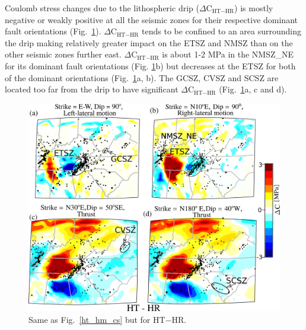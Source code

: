 \documentclass[draft,linenumbers]{agujournal2018}
\begin{document}
Coulomb stress changes due to the lithospheric drip ($\Delta$C$_{\text{HT}-\text{HR}}$) is mostly negative or weakly positive at all the seismic zones for their respective dominant fault orientations (Fig.~\ref{ht_hr_cs}). $\Delta$C$_{\text{HT}-\text{HR}}$ tends to be confined to an area surrounding the drip making relatively greater impact on the ETSZ and NMSZ than on the other seismic zones further east. $\Delta$C$_{\text{HT}-\text{HR}}$ is about 1-2 MPa in the NMSZ\_NE for its dominant fault orientations (Fig. \ref{ht_hr_cs}b) but decreases at the ETSZ for both of the dominant orientations (Fig.~\ref{ht_hr_cs}a, b). The GCSZ, CVSZ and SCSZ are located too far from the drip to have significant $\Delta$C$_{\text{HT}-\text{HR}}$ (Fig.~\ref{ht_hr_cs}a, c and d).

\begin{figure}[ht]
    \centering
    \includegraphics[width=0.75\linewidth]{figures/cs_ht_hr.png}
    \caption{Same as Fig.~\ref{ht_hm_cs} but for HT$-$HR.}
    \label{ht_hr_cs}
\end{figure}
\end{document}
